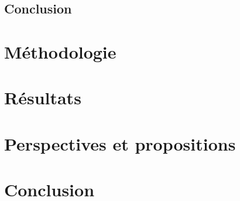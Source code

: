 \documentclass[11pt,a4paper,oneside]{report}
\begin{document}
	\section{Conclusion}
	
	
\chapter{Méthodologie}
	
	
\chapter{Résultats}
		

\chapter{Perspectives et propositions}
	

\chapter*{Conclusion}	
	
	
	
\end{document}
